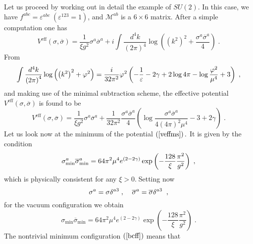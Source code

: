 \documentclass[a4paper,12pt]{article}
\begin{document}
Let us proceed by working out in detail the example of $SU(2)$. In this
case, we have $f^{abc}=\varepsilon ^{abc}\;(\varepsilon ^{123}=1)$, and $%
\mathcal{M}^{ab}$ is a $6\times 6$ matrix. After a simple computation one
has 
\begin{equation}
V^{\mathrm{eff}}(\sigma ,\overline{\sigma })=\frac{1}{\xi g^{2}}\sigma ^{a}%
\overline{\sigma }^{a}+i\int \frac{d^{4}k}{\left( 2\pi \right) ^{4}}\log
\left( \left( k^{2}\right) ^{2}+\frac{\sigma ^{a}\overline{\sigma }^{a}}{4}%
\right) \;.  \label{vss1cf}
\end{equation}
From 
\begin{equation}
\int \frac{d^{4}k}{\left( 2\pi \right) ^{4}}\log \left( \left( k^{2}\right)
^{2}+\varphi ^{2}\right) =\frac{i}{32\pi ^{2}}\varphi ^{2}\left( -\frac{1}{%
\varepsilon }-2\gamma +2\log 4\pi -\log \frac{\varphi ^{2}}{\mu ^{4}}%
+3\right) \;,  \label{ighcf}
\end{equation}
and making use of the minimal subtraction scheme, the effective potential $%
V^{\mathrm{eff}}(\sigma ,\overline{\sigma })$ is found to be 
\begin{equation}
V^{\mathrm{eff}}(\sigma ,\overline{\sigma })=\frac{1}{\xi g^{2}}\sigma ^{a}%
\overline{\sigma }^{a}+\frac{1}{32\pi ^{2}}\frac{\sigma ^{a}\overline{\sigma 
}^{a}}{4}\left( \log \frac{\sigma ^{a}\overline{\sigma }^{a}}{4\left( 4\pi
\right) ^{2}\mu ^{4}}-3+2\gamma \right) \;.  \label{veffms}
\end{equation}
Let us look now at the minimum of the potential $\left( \ref{veffms}\right) .
$ It is given by the condition 
\begin{equation}
\sigma _{\mathrm{\min }}^{a}\overline{\sigma }_{\mathrm{\min }}^{a}=64\pi
^{2}\mu ^{4}e^{\left( 2-2\gamma \right) }\exp \left( -\frac{128}{\xi }\frac{%
\pi ^{2}}{g^{2}}\right) \;,  \label{min}
\end{equation}
which is physically consistent for any $\xi >0.\;$Setting now 
\begin{equation}
\sigma ^{a}=\sigma \delta ^{a3}\;,\;\;\;\;\overline{\sigma }^{a}=\overline{%
\sigma }\delta ^{a3}\;\;,  \label{3d}
\end{equation}
for the vacuum configuration we obtain 
\begin{equation}
\sigma _{\mathrm{\min }}\overline{\sigma }_{\mathrm{\min }}=64\pi ^{2}\mu
^{4}e^{\left( 2-2\gamma \right) }\exp \left( -\frac{128}{\xi }\frac{\pi ^{2}%
}{g^{2}}\right) \;.  \label{bcff}
\end{equation}
The nontrivial minimum configuration $\left( \ref{bcff}\right) $ means that
\end{document}

